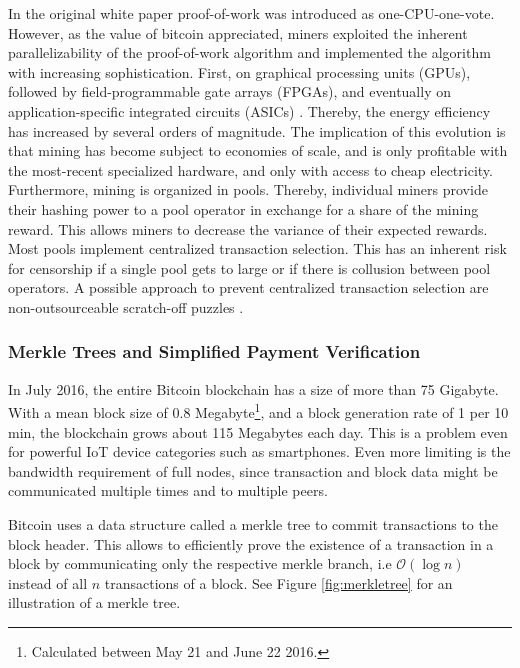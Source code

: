 In the original white paper proof-of-work was introduced as one-CPU-one-vote. However, as the value of bitcoin appreciated, miners exploited the inherent parallelizability of the proof-of-work algorithm and implemented the algorithm with increasing sophistication. First, on graphical processing units (GPUs), followed by field-programmable gate arrays (FPGAs), and eventually on application-specific integrated circuits (ASICs) \parencite{taylor2013bitcoin}. Thereby, the energy efficiency has increased by several orders of magnitude. The implication of this evolution is that mining has become subject to economies of scale, and is only profitable with the most-recent specialized hardware, and only with access to cheap electricity. Furthermore, mining is organized in pools. Thereby, individual miners provide their hashing power to a pool operator in exchange for a share of the mining reward. This allows miners to decrease the variance of their expected rewards. Most pools implement centralized transaction selection. This has an inherent risk for censorship if a single pool gets to large or if there is collusion between pool operators. A possible approach to prevent centralized transaction selection are non-outsourceable scratch-off puzzles \parencite{Miller:2015:NSP:2810103.2813621}.  

\subsubsection{Merkle Trees and Simplified Payment Verification}
\label{sec:spv}

In July 2016, the entire Bitcoin blockchain has a size of more than 75 Gigabyte. With a mean block size of 0.8 Megabyte\footnote{Calculated between May 21 and June 22 2016.}, and a block generation rate of 1 per 10 min, the blockchain grows about 115 Megabytes each day. This is a problem even for powerful IoT device categories such as smartphones. Even more limiting is the bandwidth requirement of full nodes, since transaction and block data might be communicated multiple times and to multiple peers. 

Bitcoin uses a data structure called a merkle tree \parencite{merkle1980protocols} to commit transactions to the block header. This allows to efficiently prove the existence of a transaction in a block by communicating only the respective merkle branch, i.e $\mathcal{O}(\log{}n)$ instead of all $n$ transactions of a block. See Figure \ref{fig:merkletree} for an illustration of a merkle tree. 

